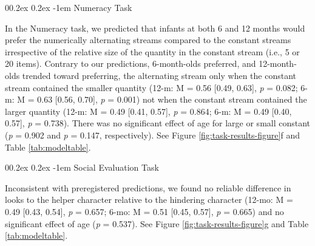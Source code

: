 \documentclass[
  english,
  man,floatsintext]{apa6}
\makeatletter
\let\oldparagraph\paragraph
\renewcommand{\paragraph}{
    \@ifstar
      \xxxParagraphStar
      \xxxParagraphNoStar
  }
\newcommand{\xxxParagraphStar}[1]{\oldparagraph*{#1}\mbox{}}
\newcommand{\xxxParagraphNoStar}[1]{\oldparagraph{#1}\mbox{}}
\renewcommand{\paragraph}{\@startsection{paragraph}{4}{\parindent}%
  {0\baselineskip \@plus 0.2ex \@minus 0.2ex}%
  {-1em}%
  {\normalfont\normalsize\bfseries\itshape\typesectitle}}
\makeatother
\begin{document}
\paragraph{Numeracy Task}\label{numeracy-task}

In the Numeracy task, we predicted that infants at both 6 and 12 months would prefer the numerically alternating streams compared to the constant streams irrespective of the relative size of the quantity in the constant stream (i.e., 5 or 20 items).
Contrary to our predictions, 6-month-olds preferred, and 12-month-olds trended toward preferring, the alternating stream only when the constant stream contained the smaller quantity (12-m: M = 0.56 {[}0.49, 0.63{]}, \emph{p} = 0.082; 6-m: M = 0.63 {[}0.56, 0.70{]}, \emph{p} = 0.001) not when the constant stream contained the larger quantity (12-m: M = 0.49 {[}0.41, 0.57{]}, \emph{p} = 0.864; 6-m: M = 0.49 {[}0.40, 0.57{]}, \emph{p} = 0.738).
There was no significant effect of age for large or small constant (\emph{p} = 0.902 and \emph{p} = 0.147, respectively).
See Figure \ref{fig:task-results-figure}f and Table \ref{tab:modeltable}.

\paragraph{Social Evaluation Task}\label{social-evaluation-task}

Inconsistent with preregistered predictions, we found no reliable difference in looks to the helper character relative to the hindering character (12-mo: M = 0.49 {[}0.43, 0.54{]}, \emph{p} = 0.657; 6-mo: M = 0.51 {[}0.45, 0.57{]}, \emph{p} = 0.665) and no significant effect of age (\emph{p} = 0.537).
See Figure \ref{fig:task-results-figure}g and Table \ref{tab:modeltable}.
\end{document}
